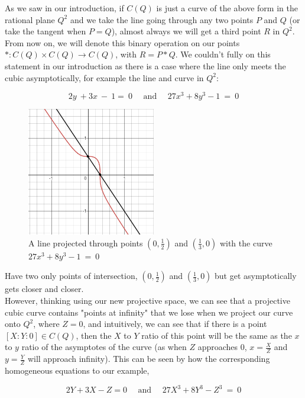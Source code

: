 \documentclass{article}
\begin{document}
As we saw in our introduction, if $C(Q)$ is just a curve of the above form in the rational plane $Q^2$ and we take the line going through any two points $P$ and $Q$ (or take the tangent when $P = Q$), almost always we will get a third point $R$ in $Q^2$. From now on, we will denote this binary operation on our points $* : C(Q) \times C(Q) \rightarrow C(Q)$, with $R = P * Q$. We couldn't fully on this statement in our introduction as there is a case where the line only meets the cubic asymptotically, for example the line and curve in $Q^2$:

\[ 2y\ +3x\ -\ 1=\ 0 \quad \text{ and } \quad 27x^{3}+8y^{3}-1 \ = \ 0 \]

\begin{figure}
\centering
\includegraphics[width=0.5\textwidth]{desmos-graph (1).png}
\caption{\label{fig:asymptote} A line projected through points $(0, \frac{1}{2})$ and $(\frac{1}{3}, 0)$ with the curve $27x^{3}+8y^{3}-1 \ = \ 0$}
\end{figure}

Have two only points of intersection, $(0, \frac{1}{2})$ and $(\frac{1}{3}, 0)$ but get asymptotically gets closer and closer. \\

However, thinking using our new projective space, we can see that a projective cubic curve contains "points at infinity" that we lose when we project our curve onto $Q^2$, where $Z = 0$, and intuitively, we can see that if there is a point $[X : Y : 0] \in C(Q)$, then the $X$ to $Y$ ratio of this point will be the same as the $x$ to $y$ ratio of the asymptotes of the curve (as when $Z$ approaches $0$, $x = \frac{X}{Z}$ and $y = \frac{Y}{Z}$ will approach infinity). This can be seen by how the corresponding homogeneous equations to our example,

\[2Y + 3X - Z = 0 \quad \text{ and } \quad 27X^{3}+8Y^{3}-Z^3 \ = \ 0 \] 
\end{document}
